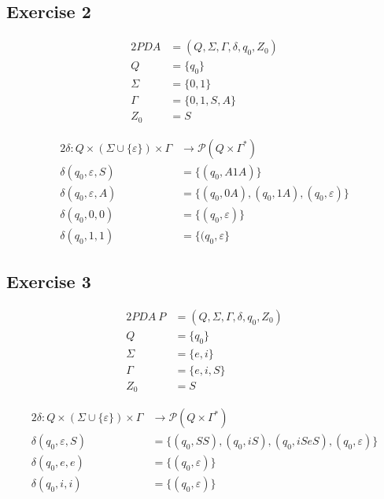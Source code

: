 {\subsection{Exercise 2} \label{TP09_2}
\begin{center}
\begin{minipage}[c]{0.30\textwidth}
\begin{alignat*}{2}
	PDA    &= (Q, \Sigma, \Gamma, \delta, q_0, Z_0)\\
	Q      &= \{q_0\}\\
	\Sigma &= \{0,1\}\\
	\Gamma &= \{0,1,S,A\}\\
	Z_0    &= S
\end{alignat*}
\end{minipage}%
\begin{minipage}[c]{0.60\textwidth}
\begin{alignat*}{2}
	\delta \colon Q \times (\Sigma \cup \{\varepsilon\}) \times \Gamma & \rightarrow \mathscr{P}(Q \times \Gamma^*)\\
	\delta(q_0, \varepsilon, S) &= \{(q_0, A1A)\} \\
	\delta(q_0, \varepsilon, A) &= \{(q_0,0A), (q_0, 1A),(q_0,\varepsilon)\}\\
	\delta(q_0, 0, 0) &= \{(q_0, \varepsilon)\}\\
	\delta(q_0, 1, 1) &= \{(q_0, \varepsilon\}
\end{alignat*}
\end{minipage}
\end{center}
\subsection{Exercise 3} \label{TP09_3}
\begin{center}
\begin{minipage}[c]{0.4\textwidth}
\begin{alignat*}{2}
	PDA ~ P &= (Q,\Sigma,\Gamma,\delta, q_0, Z_0)\\
	Q       &= \{q_0\}\\
	\Sigma  &= \{e,i\}\\
	\Gamma  &= \{e,i,S\}\\
	Z_0     &= S
\end{alignat*}
\end{minipage}%
\begin{minipage}[c]{0.6\textwidth}
\begin{alignat*}{2}
	\delta \colon Q \times (\Sigma \cup \{\varepsilon\}) \times \Gamma & \rightarrow \mathscr{P}(Q \times \Gamma ^*)\\
	\delta (q_0,\varepsilon ,S) &=\{(q_0,SS),(q_0,iS),(q_0,iSeS), (q_0, \varepsilon)\}\\
	\delta (q_0,e,e)&=\{(q_0,\varepsilon)\}\\
	\delta (q_0,i,i)&=\{(q_0,\varepsilon)\}
\end{alignat*}
\end{minipage}
\end{center}
}
